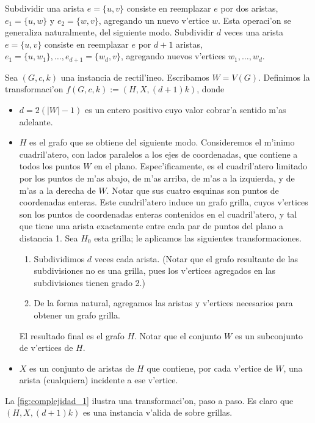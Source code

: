 \label{su:transformacion}

Subdividir una arista $e = \{u, v\}$ consiste en reemplazar $e$ por dos aristas, $e_1 = \{u, w\}$ y $e_2 = \{w, v\}$, agregando un nuevo v'ertice $w$. Esta operaci'on se generaliza naturalmente, del siguiente modo. Subdividir $d$ veces una arista $e = \{u, v\}$ consiste en reemplazar $e$ por $d + 1$ aristas, $e_1 = \{u, w_1\}, \dots, e_{d + 1} = \{w_d, v\}$, agregando nuevos v'ertices $w_1, \dots, w_d$.

Sea $(G, c, k)$ una instancia de  rectil'ineo. Escribamos $W = V(G)$. Definimos la transformaci'on $f(G, c, k) := (H, X, (d + 1)k)$, donde

\begin{itemize}
\item $d = 2(|W| - 1)$ es un entero positivo cuyo valor cobrar'a sentido m'as adelante.
\item $H$ es el grafo que se obtiene del siguiente modo. Consideremos el m'inimo cuadril'atero, con lados paralelos a los ejes de coordenadas, que contiene a todos los puntos $W$ en el plano. Espec'ificamente, es el cuadril'atero limitado por los puntos de m'as abajo, de m'as arriba, de m'as a la izquierda, y de m'as a la derecha de $W$. Notar que sus cuatro esquinas son puntos de coordenadas enteras. Este cuadril'atero induce un grafo grilla, cuyos v'ertices son los puntos de coordenadas enteras contenidos en el cuadril'atero, y tal que tiene una arista exactamente entre cada par de puntos del plano a distancia 1. Sea $H_0$ esta grilla; le aplicamos las siguientes transformaciones.
\begin{enumerate}
	\item Subdividimos $d$ veces cada arista. (Notar que el grafo resultante de las subdivisiones no es una grilla, pues los v'ertices agregados en las subdivisiones tienen grado 2.)
	\item De la forma natural, agregamos las aristas y v'ertices necesarios para obtener un grafo grilla.
\end{enumerate}

El resultado final es el grafo $H$. Notar que el conjunto $W$ es un subconjunto de v'ertices de $H$.

\item $X$ es un conjunto de aristas de $H$ que contiene, por cada v'ertice de $W$, una arista (cualquiera) incidente a ese v'ertice.
\end{itemize}

\noindent
La \autoref{fig:complejidad_1} ilustra una transformaci'on, paso a paso. Es claro que $(H, X, (d + 1)k)$ es una instancia v'alida de  sobre grillas.

